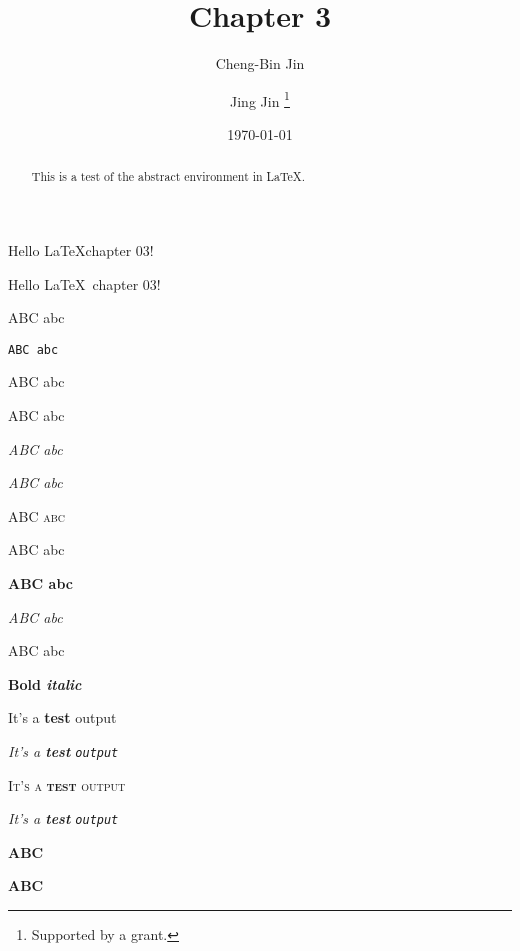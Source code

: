 \documentclass[11pt]{article}
\title{Chapter 3}
\author{Cheng-Bin Jin \and Jing Jin \thanks{Supported by a grant.}}
\date{\today}
\begin{document}
\maketitle

\begin{abstract}
This is a test of the abstract environment in \LaTeX.

\end{abstract}
\pagestyle{myheadings}

\thispagestyle{myheadings}

Hello \LaTeX chapter 03!

Hello \LaTeX \ chapter 03!

\textrm{ABC abc}

\texttt{ABC abc}

\textsf{ABC abc}

\textup{ABC abc}

\textit{ABC abc}

\textsl{ABC abc}

\textsc{ABC abc}

\textmd{ABC abc}

\textbf{ABC abc}

\emph{ABC abc}

\textnormal{ABC abc}

\textbf{Bold \textit{italic}}

\textup{It's a \textbf{test} \textrm{output}}

\textit{It's a \textbf{test} \texttt{output}}

\textsc{It's a \textbf{test} \textsf{output}}

\textsl{It's a \textbf{test} \texttt{output}}

{\Large \bf ABC}

{\bf \Large ABC}
\end{document}
